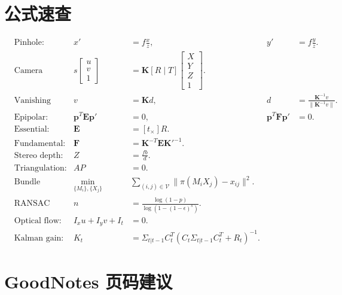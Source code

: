 \documentclass[11pt]{article}
\newcommand{\K}{\mathbf{K}}
\newcommand{\E}{\mathbf{E}}
\newcommand{\F}{\mathbf{F}}
\newcommand{\p}{\mathbf{p}}
\begin{document}
\section*{公式速查}

\begin{align*}
  &\text{Pinhole:} &
  x'&=f\frac{x}{z},&
  y'&=f\frac{y}{z}.\\
  &\text{Camera projection:} &
  s\begin{bmatrix}u\\v\\1\end{bmatrix}
  &=\K[R\mid T]\begin{bmatrix}X\\Y\\Z\\1\end{bmatrix}.\\
  &\text{Vanishing point:} &
  v&=\K d,&
  d&=\frac{\K^{-1}v}{\|\K^{-1}v\|}.\\
  &\text{Epipolar:} &
  \p^T\E\p'&=0,&
  \p^T\F\p'&=0.\\
  &\text{Essential:} &
  \E&=[t_\times]R.\\
  &\text{Fundamental:} &
  \F&=\K^{-T}\E{\K'}^{-1}.\\
  &\text{Stereo depth:} &
  Z&=\frac{fb}{d}.\\
  &\text{Triangulation:} &
  AP&=0.\\
  &\text{Bundle adjustment:} &
  \min_{\{M_i\},\{X_j\}}
  &\sum_{(i,j)\in\mathcal V}
  \|\pi(M_iX_j)-x_{ij}\|^2.\\
  &\text{RANSAC iterations:} &
  n&=\frac{\log(1-p)}{\log(1-(1-\epsilon)^s)}.\\
  &\text{Optical flow:} &
  I_xu+I_yv+I_t&=0.\\
  &\text{Kalman gain:} &
  K_t&=\Sigma_{t|t-1}C_t^T(C_t\Sigma_{t|t-1}C_t^T+R_t)^{-1}.
\end{align*}

\section*{GoodNotes 页码建议}
\end{document}
